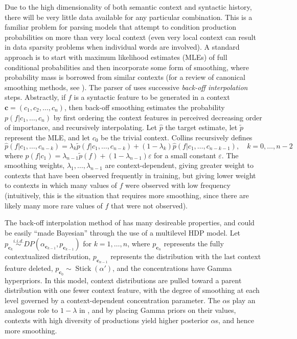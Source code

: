 \documentclass[12pt]{article}
\DeclareMathOperator{\Stick}{Stick}
\begin{document}
Due to the high dimensionality of both semantic context and syntactic history, there will be very little data available for any particular combination.  This is a familiar problem for parsing models that attempt to condition production probabilities on more than very local context (even very local context can result in data sparsity problems when individual words are involved).  A standard approach is to start with maximum likelihood estimates (MLEs) of full conditional probabilities and then incorporate some form of smoothing, where probability mass is borrowed from similar contexts (for a review of canonical smoothing methods, see \cite{chen1999empirical}).  The parser of \cite{collins2003head} uses successive {\it back-off interpolation} steps.  Abstractly, if $f$ is a syntactic feature to be generated in a context $\mathbf{c} = (c_1, c_2, \dots, c_n)$, then back-off smoothing estimates the probability $p(f \vert c_1, \dots, c_n)$ by first ordering the context features in perceived decreasing order of importance, and recursively interpolating.  Let $\hat{p}$ the target estimate, let $\tilde{p}$ represent the MLE, and let $c_0$ be the trivial context.  Collins recursively defines
\begin{equation}
  \label{eq:3}
  \hat{p}(f \vert c_1, \dots, c_{n-k}) = \lambda_k \tilde{p}(f \vert c_1, \dots, c_{n-k}) + (1 - \lambda_k) \hat{p}(f \vert c_1, \dots, c_{n-k-1}), \quad k = 0, \dots, n-2
\end{equation}
where $\hat{p}(f \vert c_1) = \lambda_{n-1} \tilde{p}(f) + (1 - \lambda_{n-1}) \varepsilon$ for a small constant $\varepsilon$.  The smoothing weights, $\lambda_1, \dots, \lambda_{n-1}$ are context-dependent, giving greater weight to contexts that have been observed frequently in training, but giving lower weight to contexts in which many values of $f$ were observed with low frequency (intuitively, this is the situation that requires more smoothing, since there are likely many more rare values of $f$ that were not observed).

The back-off interpolation method of \cite{collins2003head} has many desireable properties, and could be easily ``made Bayesian'' through the use of a multilevel HDP model. Let $p_{\mathbf{c}_{k}} \stackrel{i.i.d.}{\sim} DP(\alpha_{\mathbf{c}_{k-1}}, p_{\mathbf{c}_{k-1}})$ for $k=1,\dots,n$, where $p_{\mathbf{c}_n}$ represents the fully contextualized distribution, $p_{\mathbf{c}_{n-1}}$ represents the distribution with the last context feature deleted, $p_{\mathbf{c}_{0}} \sim \Stick(\alpha')$, and the concentrations have Gamma hyperpriors.  In this model, context distributions are pulled toward a parent distribution with one fewer context feature, with the degree of smoothing at each level governed by a context-dependent concentration parameter.  The $\alpha$s play an analogous role to $1 - \lambda$ in \cite{collins2003head}, and by placing Gamma priors on their values, contexts with high diversity of productions yield higher posterior $\alpha$s, and hence more smoothing.
\end{document}
